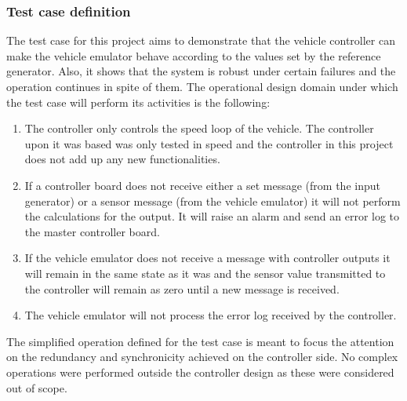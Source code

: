 \documentclass[table,xcdraw]{article}
\begin{document}
\subsubsection{Test case definition}
The test case for this project aims to demonstrate that the vehicle controller can make the vehicle emulator behave according to the values set by the reference generator. Also, it shows that the system is robust under certain failures and the operation continues in spite of them. The operational design domain under which the test case will perform its activities is the following:
\begin{enumerate}
    \item The controller only controls the speed loop of the vehicle. The controller upon it was based was only tested in speed and the controller in this project does not add up any new functionalities.
    \item If a controller board does not receive either a set message (from the input generator) or a sensor message (from the vehicle emulator) it will not perform the calculations for the output. It will raise an alarm and send an error log to the master controller board.
    \item If the vehicle emulator does not receive a message with controller outputs it will remain in the same state as it was and the sensor value transmitted to the controller will remain as zero until a new message is received.
    \item The vehicle emulator will not process the error log received by the controller.
\end{enumerate}
The simplified operation defined for the test case is meant to focus the attention on the redundancy and synchronicity achieved on the controller side. No complex operations were performed outside the controller design as these were considered out of scope.\\
\end{document}
